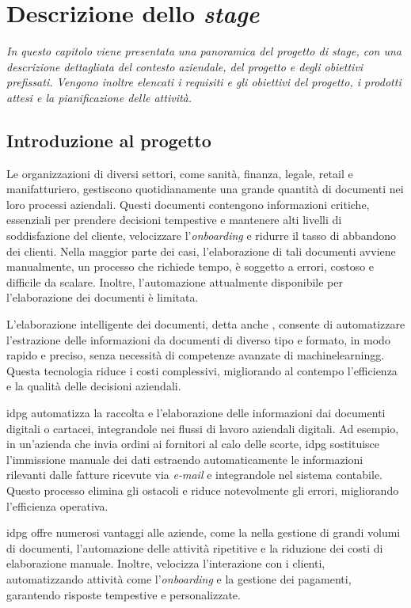 \chapter{Descrizione dello \emph{stage}}
\label{cap:descrizione-stage}

\emph{In questo capitolo viene presentata una panoramica del progetto di stage, con una descrizione dettagliata del contesto aziendale, del progetto e degli obiettivi prefissati. Vengono inoltre elencati i requisiti e gli obiettivi del progetto, i prodotti attesi e la pianificazione delle attività.}

\section{Introduzione al progetto}

Le organizzazioni di diversi settori, come sanità, finanza, legale, retail e manifatturiero, gestiscono quotidianamente una grande quantità di documenti nei loro processi aziendali. Questi documenti contengono informazioni critiche, essenziali per prendere decisioni tempestive e mantenere alti livelli di soddisfazione del cliente, velocizzare l'\emph{onboarding} e ridurre il tasso di abbandono dei clienti. Nella maggior parte dei casi, l'elaborazione di tali documenti avviene manualmente, un processo che richiede tempo, è soggetto a errori, costoso e difficile da scalare. Inoltre, l'automazione attualmente disponibile per l'elaborazione dei documenti è limitata.

L'elaborazione intelligente dei documenti, detta anche , consente di automatizzare l'estrazione delle informazioni da documenti di diverso tipo e formato, in modo rapido e preciso, senza necessità di competenze avanzate di \gls{machinelearningg}. Questa tecnologia riduce i costi complessivi, migliorando al contempo l'efficienza e la qualità delle decisioni aziendali.

\gls{idpg} automatizza la raccolta e l'elaborazione delle informazioni dai documenti digitali o cartacei, integrandole nei flussi di lavoro aziendali digitali. Ad esempio, in un'azienda che invia ordini ai fornitori al calo delle scorte, \gls{idpg} sostituisce l'immissione manuale dei dati estraendo automaticamente le informazioni rilevanti dalle fatture ricevute via \emph{e-mail} e integrandole nel sistema contabile. Questo processo elimina gli ostacoli e riduce notevolmente gli errori, migliorando l'efficienza operativa.

\gls{idpg} offre numerosi vantaggi alle aziende, come la  nella gestione di grandi volumi di documenti, l'automazione delle attività ripetitive e la riduzione dei costi di elaborazione manuale. Inoltre, velocizza l'interazione con i clienti, automatizzando attività come l'\emph{onboarding} e la gestione dei pagamenti, garantendo risposte tempestive e personalizzate. 

